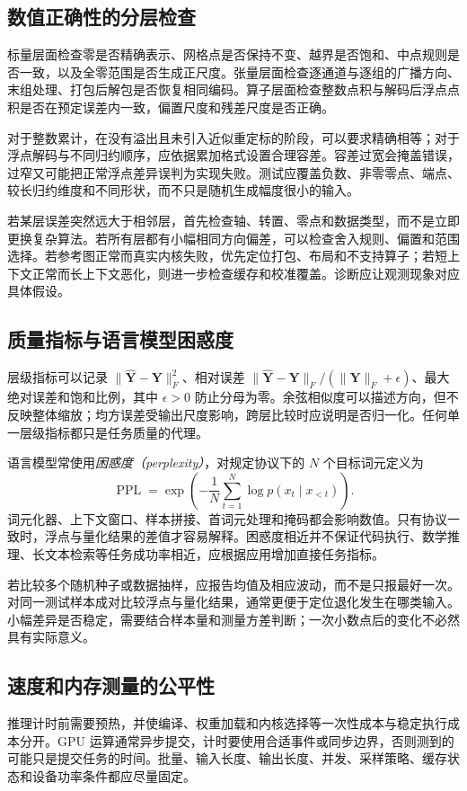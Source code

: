 \documentclass[UTF8,12pt,a4paper,fontset=fandol]{ctexart}
\begin{document}
\subsection{数值正确性的分层检查}
标量层面检查零是否精确表示、网格点是否保持不变、越界是否饱和、中点规则是否一致，以及全零范围是否生成正尺度。张量层面检查逐通道与逐组的广播方向、末组处理、打包后解包是否恢复相同编码。算子层面检查整数点积与解码后浮点点积是否在预定误差内一致，偏置尺度和残差尺度是否正确。

对于整数累计，在没有溢出且未引入近似重定标的阶段，可以要求精确相等；对于浮点解码与不同归约顺序，应依据累加格式设置合理容差。容差过宽会掩盖错误，过窄又可能把正常浮点差异误判为实现失败。测试应覆盖负数、非零零点、端点、较长归约维度和不同形状，而不只是随机生成幅度很小的输入。

若某层误差突然远大于相邻层，首先检查轴、转置、零点和数据类型，而不是立即更换复杂算法。若所有层都有小幅相同方向偏差，可以检查舍入规则、偏置和范围选择。若参考图正常而真实内核失败，优先定位打包、布局和不支持算子；若短上下文正常而长上下文恶化，则进一步检查缓存和校准覆盖。诊断应让观测现象对应具体假设。

\subsection{质量指标与语言模型困惑度}
层级指标可以记录 $\|\widehat{\mathbf Y}-\mathbf Y\|_F^2$、相对误差 $\|\widehat{\mathbf Y}-\mathbf Y\|_F/(\|\mathbf Y\|_F+\epsilon)$、最大绝对误差和饱和比例，其中 $\epsilon>0$ 防止分母为零。余弦相似度可以描述方向，但不反映整体缩放；均方误差受输出尺度影响，跨层比较时应说明是否归一化。任何单一层级指标都只是任务质量的代理。

语言模型常使用\emph{困惑度（perplexity）}，对规定协议下的 $N$ 个目标词元定义为
\begin{equation}
 \operatorname{PPL}=\exp\!\left(-\frac1N\sum_{t=1}^N
 \log p(x_t\mid x_{<t})\right).
 \label{eq:quant-ppl}
\end{equation}
词元化器、上下文窗口、样本拼接、首词元处理和掩码都会影响数值。只有协议一致时，浮点与量化结果的差值才容易解释。困惑度相近并不保证代码执行、数学推理、长文本检索等任务成功率相近，应根据应用增加直接任务指标。

若比较多个随机种子或数据抽样，应报告均值及相应波动，而不是只报最好一次。对同一测试样本成对比较浮点与量化结果，通常更便于定位退化发生在哪类输入。小幅差异是否稳定，需要结合样本量和测量方差判断；一次小数点后的变化不必然具有实际意义。

\subsection{速度和内存测量的公平性}
推理计时前需要预热，并使编译、权重加载和内核选择等一次性成本与稳定执行成本分开。GPU 运算通常异步提交，计时要使用合适事件或同步边界，否则测到的可能只是提交任务的时间。批量、输入长度、输出长度、并发、采样策略、缓存状态和设备功率条件都应尽量固定。
\end{document}
